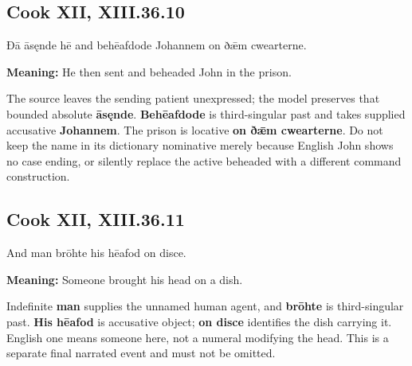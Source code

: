 \par\begin{minipage}{\linewidth}\raggedright
\subsection*{Cook XII, XIII.36.10}

Ðā āsęnde hē and behēafdode Johannem on ðǣm cwearterne.

\textbf{Meaning:} He then sent and beheaded John in the prison.

The source leaves the sending patient unexpressed; the model preserves that bounded absolute \textbf{āsęnde}. \textbf{Behēafdode} is third-singular past and takes supplied accusative \textbf{Johannem}. The prison is locative \textbf{on ðǣm cwearterne}. Do not keep the name in its dictionary nominative merely because English John shows no case ending, or silently replace the active beheaded with a different command construction.

\end{minipage}\par\addvspace{4pt}

\par\begin{minipage}{\linewidth}\raggedright
\subsection*{Cook XII, XIII.36.11}

And man brōhte his hēafod on disce.

\textbf{Meaning:} Someone brought his head on a dish.

Indefinite \textbf{man} supplies the unnamed human agent, and \textbf{brōhte} is third-singular past. \textbf{His hēafod} is accusative object; \textbf{on disce} identifies the dish carrying it. English one means someone here, not a numeral modifying the head. This is a separate final narrated event and must not be omitted.

\end{minipage}\par\addvspace{4pt}

